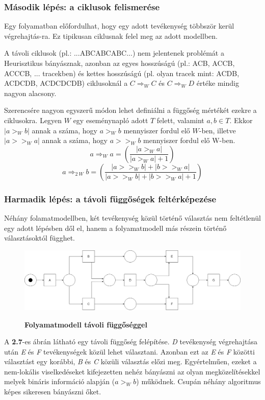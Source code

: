\subsubsection{Második lépés: a ciklusok felismerése}

Egy folyamatban előfordulhat, hogy egy adott tevékenység többször kerül végrehajtás\hyp{}ra. Ez tipikusan ciklusnak felel meg az adott modellben.

A távoli ciklusok (pl.: ...ABCABCABC...) nem jelentenek problémát a Heurisztikus bányásznak, azonban az egyes hosszúságú (pl.: ACB, ACCB, ACCCB, ... tracekben) és kettes hosszúságú (pl. olyan tracek mint: ACDB, ACDCDB, ACDCDCDB) ciklusoknál a $C\Rightarrow_WC$ és $C\Rightarrow_WD$ értéke mindig nagyon alacsony.

Szerencsére nagyon egyszerű módon lehet definiálni a függőség mértékét ezekre a ciklusokra. Legyen $W$ egy eseménynapló adott $T$ felett, valamint $a,b \in T$. Ekkor $|a>_W b|$ annak a száma, hogy $a>_Wb$ mennyiszer fordul elő $W$-ben, illetve $|a>>_Wa|$ annak a száma, hogy $a>>_Wb$ mennyiszer fordul elő W-ben.
\[
a\Rightarrow_Wa=\left(\frac{|a>_Wa|}{|a>_Wa|+1}\right)
\]
\[
a\Rightarrow_{2\ W} b=\left(\frac{|a>>_Wb|+|b>>_Wa|}{|a>>_Wb|+|b>>_Wa|+1}\right)
\]

\subsubsection{Harmadik lépés: a távoli függőségek feltérképezése}

Néhány folamatmodellben, két tevékenység közül történő választás nem feltétlenül egy adott lépésben dől el, hanem a folyamatmodell más részein történő választásoktól függhet.

\begin{figure}[h!]
\begin{center}
\caption{\textbf{Folyamatmodell távoli függőséggel}}
\includegraphics[width=\textwidth,keepaspectratio=true]{images/img_heuristic_longdistance}
\label{fig:plan}
\end{center}
\end{figure}

A \textbf{2.7}-es ábrán látható egy távoli függőség felépítése. \textit{D} tevékenység végrehajtása után \textit{E} és \textit{F} tevékenységek közül lehet választani. Azonban ezt az \textit{E} és \textit{F} közötti választást egy korábbi, \textit{B} és \textit{C} közüli választás előzi meg. Egyértelműen, ezeket a nem-lokális viselkedéseket kifejezetten nehéz bányászni az olyan megközelítésekkel melyek bináris információ alapján ($a>_Wb$) működnek. Csupán néhány algoritmus képes sikeresen bányászni őket.

